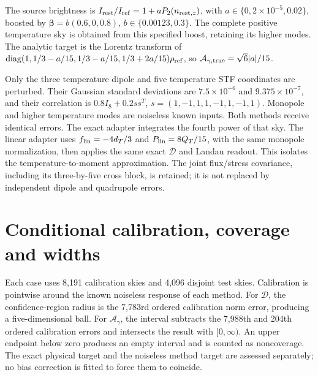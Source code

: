 \documentclass[aps,prd,reprint,onecolumn,nofootinbib]{revtex4-2}
\begin{document}
The source brightness is
\(I_{\rm rest}/I_{\rm ref}=1+aP_2(n_{{\rm rest},z})\), with
\(a\in\{0,2\times10^{-5},0.02\}\), boosted by
\(\boldsymbol\beta=b(0.6,0,0.8)\), \(b\in\{0.00123,0.3\}\). The complete
positive temperature sky is obtained from this specified boost,
retaining its higher modes. The analytic target is the Lorentz transform
of \(\operatorname{diag}(1,1/3-a/15,1/3-a/15,1/3+2a/15)\rho_{\rm ref}\),
so \(\mathcal A_{\gamma,\rm true}=\sqrt6|a|/15\).

Only the three temperature dipole and five temperature STF coordinates
are perturbed. Their Gaussian standard deviations are
\(7.5\times10^{-6}\) and \(9.375\times10^{-7}\), and their correlation
is \(0.8I_8+0.2ss^T\), \(s=(1,-1,1,1,-1,1,-1,1)\). Monopole and higher
temperature modes are noiseless known inputs. Both methods receive
identical errors. The exact adapter integrates the fourth power of that
sky. The linear adapter uses \(f_{\rm lin}=-4d_T/3\) and
\(P_{\rm lin}=8Q_T/15\), with the same monopole normalization, then
applies the same exact \(\mathscr D\) and Landau readout. This isolates
the temperature-to-moment approximation. The joint flux/stress
covariance, including its three-by-five cross block, is retained; it is
not replaced by independent dipole and quadrupole errors.
\section{Conditional calibration, coverage and widths}
Each case uses 8,191 calibration skies and 4,096 disjoint test skies.
Calibration is pointwise around the known noiseless response of each
method. For \(\mathscr D\), the confidence-region radius is the 7,783rd
ordered calibration norm error, producing a five-dimensional ball. For
\(\mathcal A_\gamma\), the interval subtracts the 7,988th and 204th
ordered calibration errors and intersects the result with
\([0,\infty)\). An upper endpoint below zero produces an empty interval
and is counted as noncoverage. The exact physical target and the
noiseless method target are assessed separately; no bias correction is
fitted to force them to coincide.
\end{document}
